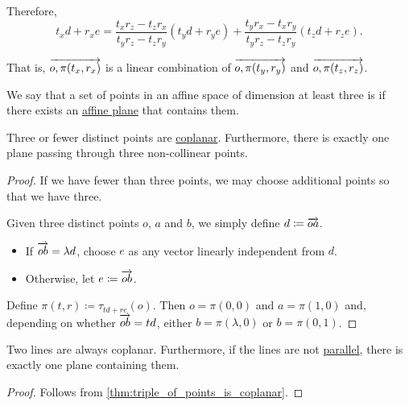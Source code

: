 \begin{defproof}
\begin{itemize}
    Therefore,
    \begin{equation*}
      t_x d + r_x e
      =
      \frac {t_x r_z - t_z r_x} {t_y r_z - t_z r_y} (t_y d + r_y e) + \frac {t_y r_x - t_x r_y} {t_y r_z - t_z r_y} (t_z d + r_z e).
    \end{equation*}

    That is, \( \overrightarrow{o,\pi(t_x,r_x)} \) is a linear combination of \( \overrightarrow{o,\pi(t_y,r_y)} \) and \( \overrightarrow{o,\pi(t_z,r_z)} \).
  \end{itemize}
\end{defproof}

\begin{definition}\label{def:coplanar_points}\mimprovised
  We say that a set of points in an affine space of dimension at least three is  if there exists an \hyperref[def:affine_plane]{affine plane} that contains them.
\end{definition}

\begin{proposition}\label{thm:triple_of_points_is_coplanar}
  Three or fewer distinct points are \hyperref[def:coplanar_points]{coplanar}. Furthermore, there is exactly one plane passing through three non-collinear points.
\end{proposition}
\begin{proof}
  If we have fewer than three points, we may choose additional points so that we have three.

  Given three distinct points \( o \), \( a \) and \( b \), we simply define \( d \coloneqq \overrightarrow{oa} \).
  \begin{itemize}
    \item If \( \overrightarrow{ob} = \lambda d \), choose \( e \) as any vector linearly independent from \( d \).
    \item Otherwise, let \( e \coloneqq \overrightarrow{ob} \).
  \end{itemize}

  Define \( \pi(t, r) \coloneqq \tau_{td + re}(o) \). Then \( o = \pi(0, 0) \) and \( a = \pi(1, 0) \) and, depending on whether \( \overrightarrow{ob} = td \), either \( b = \pi(\lambda, 0) \) or \( b = \pi(0, 1) \).
\end{proof}

\begin{proposition}\label{thm:two_lines_are_coplanar}
  Two lines are always coplanar. Furthermore, if the lines are not \hyperref[def:affine_parallelism]{parallel}, there is exactly one plane containing them.
\end{proposition}
\begin{proof}
  Follows from \cref{thm:triple_of_points_is_coplanar}.
\end{proof}

